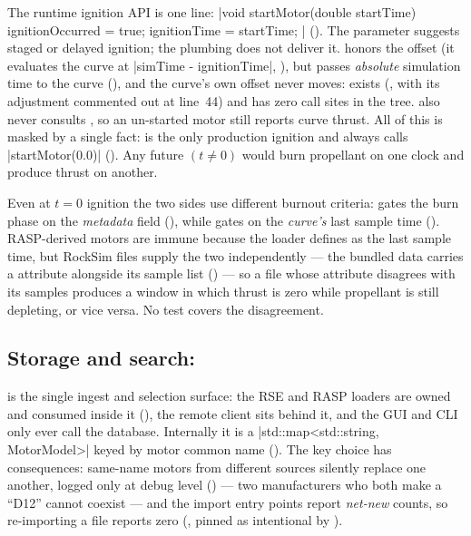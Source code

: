 The runtime ignition API is one line:
\cppinline|void startMotor(double startTime) { ignitionOccurred = true; ignitionTime = startTime; }|
(). The parameter suggests staged or delayed ignition; the plumbing
does not deliver it.  honors the offset (it evaluates the curve at
\cppinline|simTime - ignitionTime|, ), but 
passes \emph{absolute} simulation time to the curve (), and the
curve's own offset never moves:  exists
(, with its  adjustment commented out at line~44) and
has zero call sites in the tree.  also never consults , so
an un-started motor still reports curve thrust. All of this is masked by a single fact:
 is the only production ignition and always calls
\cppinline|startMotor(0.0)| (). Any future
$(t \neq 0)$ would burn propellant on one clock and produce thrust on another.

\begin{hardfail}
Even at $t=0$ ignition the two sides use different burnout criteria:  gates the burn
phase on the \emph{metadata} field  (), while
 gates on the \emph{curve's} last sample time
(). RASP-derived motors are immune because the loader defines
 as the last sample time, but RockSim files supply the two independently --- the
bundled data carries a  attribute alongside its sample list
() --- so a file whose attribute disagrees with its samples produces a
window in which thrust is zero while propellant is still depleting, or vice versa. No test covers
the disagreement. \fail
\end{hardfail}

\subsection{Storage and search: }\label{sec:motors-db}

 is the single ingest and selection surface: the RSE and RASP loaders are
owned and consumed inside it (), the remote client sits
behind it, and the GUI and CLI only ever call the database. Internally it is a
\cppinline|std::map<std::string, MotorModel>| keyed by motor common name
(). The key choice has consequences: same-name motors from
different sources silently replace one another, logged only at debug level
() --- two manufacturers who both make a ``D12'' cannot
coexist --- and the import entry points report \emph{net-new} counts, so re-importing a file
reports zero (, pinned as intentional by
).

